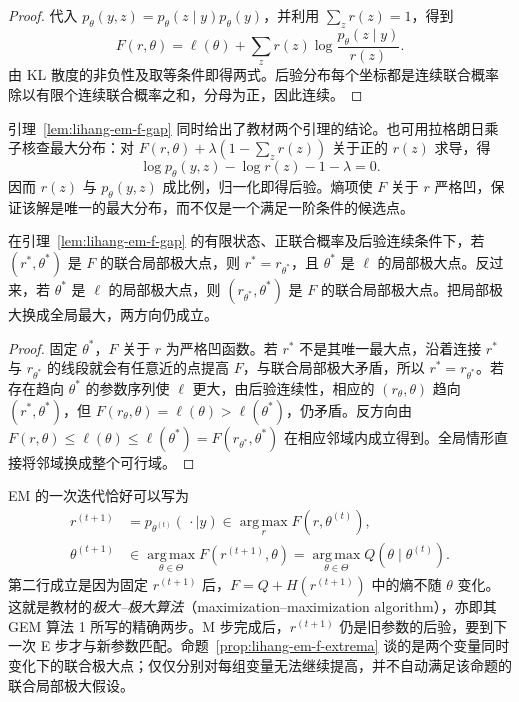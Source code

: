\begin{proof}
代入 $p_\theta(y,z)=p_\theta(z\mid y)p_\theta(y)$，并利用 $\sum_zr(z)=1$，得到
\[
  F(r,\theta)=\ell(\theta)+\sum_zr(z)\log\frac{p_\theta(z\mid y)}{r(z)}.
\]
由 KL 散度的非负性及取等条件即得两式。后验分布每个坐标都是连续联合概率除以有限个连续联合概率之和，分母为正，因此连续。
\end{proof}

引理~\ref{lem:lihang-em-f-gap} 同时给出了教材两个引理的结论。也可用拉格朗日乘子核查最大分布：对 $F(r,\theta)+\lambda(1-\sum_zr(z))$ 关于正的 $r(z)$ 求导，得
\[
  \log p_\theta(y,z)-\log r(z)-1-\lambda=0.
\]
因而 $r(z)$ 与 $p_\theta(y,z)$ 成比例，归一化即得后验。熵项使 $F$ 关于 $r$ 严格凹，保证该解是唯一的最大分布，而不仅是一个满足一阶条件的候选点。

\begin{proposition}[联合极大点与似然极大点]
\label{prop:lihang-em-f-extrema}
在引理~\ref{lem:lihang-em-f-gap} 的有限状态、正联合概率及后验连续条件下，若 $(r^*,\theta^*)$ 是 $F$ 的联合局部极大点，则 $r^*=r_{\theta^*}$，且 $\theta^*$ 是 $\ell$ 的局部极大点。反过来，若 $\theta^*$ 是 $\ell$ 的局部极大点，则 $(r_{\theta^*},\theta^*)$ 是 $F$ 的联合局部极大点。把局部极大换成全局最大，两方向仍成立。
\end{proposition}

\begin{proof}
固定 $\theta^*$，$F$ 关于 $r$ 为严格凹函数。若 $r^*$ 不是其唯一最大点，沿着连接 $r^*$ 与 $r_{\theta^*}$ 的线段就会有任意近的点提高 $F$，与联合局部极大矛盾，所以 $r^*=r_{\theta^*}$。若存在趋向 $\theta^*$ 的参数序列使 $\ell$ 更大，由后验连续性，相应的 $(r_\theta,\theta)$ 趋向 $(r^*,\theta^*)$，但 $F(r_\theta,\theta)=\ell(\theta)>\ell(\theta^*)$，仍矛盾。反方向由 $F(r,\theta)\leq\ell(\theta)\leq\ell(\theta^*)=F(r_{\theta^*},\theta^*)$ 在相应邻域内成立得到。全局情形直接将邻域换成整个可行域。
\end{proof}

EM 的一次迭代恰好可以写为
\begin{equation}
  \begin{aligned}
    r^{(t+1)}&=p_{\theta^{(t)}}(\,\cdot\mid y)
      \in\operatorname*{arg\,max}_rF(r,\theta^{(t)}),\\
    \theta^{(t+1)}&\in\operatorname*{arg\,max}_{\theta\in\Theta}F(r^{(t+1)},\theta)
      =\operatorname*{arg\,max}_{\theta\in\Theta}Q(\theta\mid\theta^{(t)}).
  \end{aligned}
  \label{eq:lihang-em-max-max}
\end{equation}
第二行成立是因为固定 $r^{(t+1)}$ 后，$F=Q+H(r^{(t+1)})$ 中的熵不随 $\theta$ 变化。这就是教材的\emph{极大--极大算法}（maximization--maximization algorithm），亦即其 GEM 算法 1 所写的精确两步。M 步完成后，$r^{(t+1)}$ 仍是旧参数的后验，要到下一次 E 步才与新参数匹配。命题~\ref{prop:lihang-em-f-extrema} 谈的是两个变量同时变化下的联合极大点；仅仅分别对每组变量无法继续提高，并不自动满足该命题的联合局部极大假设。

